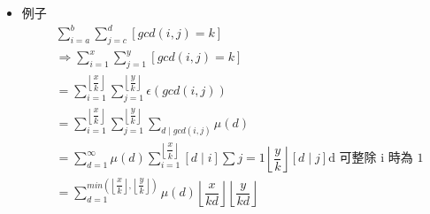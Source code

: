 \begin{itemize}
\item 例子
$$ \begin{aligned}
    &\sum_{i = a}^{b} \sum_{j = c}^{d} [gcd(i, j) = k]\\
    &\Rightarrow \sum_{i = 1}^{x} \sum_{j = 1}^{y} [gcd(i, j) = k]\\
    &= \sum_{i = 1}^{\left\lfloor\dfrac {x}{k} \right\rfloor} \sum_{j = 1}^{\left\lfloor\dfrac {y}{k} \right\rfloor} \epsilon(gcd(i, j))\\
    &= \sum_{i = 1}^{\left\lfloor\dfrac {x}{k} \right\rfloor} \sum_{j = 1}^{\left\lfloor\dfrac {y}{k} \right\rfloor} \sum_{d \mid gcd(i, j)} \mu(d)\\
    &= \sum_{d = 1}^{\infty} \mu(d) \sum_{i = 1}^{\left\lfloor\dfrac {x}{k} \right\rfloor} [d \mid i] \sum {j = 1}{\left\lfloor\dfrac {y}{k} \right\rfloor} [d \mid j] \text{d 可整除 i 時為 1}\\
    &= \sum_{d = 1}^{min(\left\lfloor\dfrac {x}{k} \right\rfloor, \left\lfloor\dfrac {y}{k} \right\rfloor)} \mu(d) \left\lfloor\dfrac {x}{kd} \right\rfloor \left\lfloor\dfrac {y}{kd} \right\rfloor
\end{aligned} $$
\end{itemize}